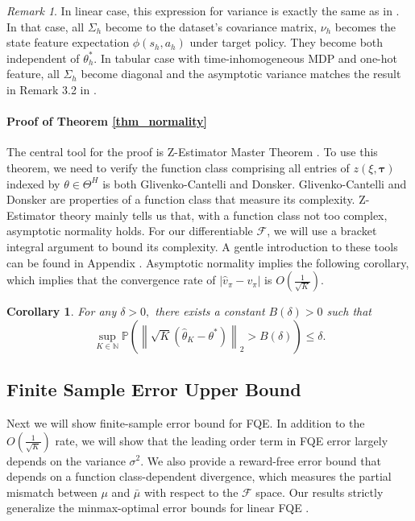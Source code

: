 \documentclass{article}
\numberwithin{equation}{section}
\newcommand{\pref}[1]{\prettyref{#1}}
\theoremstyle{plain}
\newtheorem{corollary}[theorem]{Corollary}
\theoremstyle{definition}
\theoremstyle{remark}
\newtheorem{remark}[theorem]{Remark}
\begin{document}
\begin{remark}
{}In linear case, this expression for variance is exactly the same as in \citep{bootstrap}. In that case, all $\Sigma_h$ become to the dataset's covariance matrix, $\nu_h$ becomes the state feature expectation $\phi(s_h,a_h)$ under target policy. They become both independent of $\theta_h^*.$ In tabular case with time-inhomogeneous MDP and one-hot feature, all $\Sigma_h$ become diagonal and the asymptotic variance matches the result in Remark 3.2 in \citep{yin2020asymptotically}.
\end{remark}

\paragraph{Proof of Theorem \ref{thm_normality}} The central tool for the proof is Z-Estimator Master Theorem \citep{kosorok}. To use this theorem, we need to 
verify the function class comprising all entries of $z(\xi,\boldsymbol{\tau})$ indexed by $\theta \in \Theta^H$ is both Glivenko-Cantelli and Donsker. Glivenko-Cantelli and Donsker are properties of a function class that measure its complexity. Z-Estimator theory mainly tells us that, with a function class not too complex, asymptotic normality holds. For our differentiable $\mathcal{F}$, we will use a bracket integral argument to bound its complexity. A gentle introduction to these tools can be found in Appendix \pref{sec:prep}. Asymptotic normality implies the following corollary, which implies that the convergence rate of $|\widehat{v}_{\pi} - v_{\pi}|$ is $O(\frac{1}{\sqrt{K}}).$ 
\begin{corollary}\label{coro_prohorov}
    For any $\delta > 0,$ there exists a constant $B(\delta) > 0$ such that 
    $$
    \sup _{K \in \mathbb{N}} \mathbb{P}\left(\left\|\sqrt{K}\left(\widehat{\theta}_{K}-\theta^{*}\right)\right\|_{2}>B(\delta)\right) \leq \delta.
    $$
\end{corollary}

\subsection{Finite Sample Error Upper Bound}

Next we will show finite-sample error bound for FQE. In addition to the $O(\frac{1}{\sqrt{K}})$ rate, we will show that the leading order term in FQE error largely depends on the variance $\sigma^2$. We also provide a reward-free error bound that depends on a function class-dependent divergence, which measures the partial mismatch between $\mu$ and $\bar \mu$ with respect to the $\mathcal{F}$ space. Our results strictly generalize the minmax-optimal error bounds for linear FQE \citep{bootstrap,duan2020minimax,On_PG}. 
\end{document}
